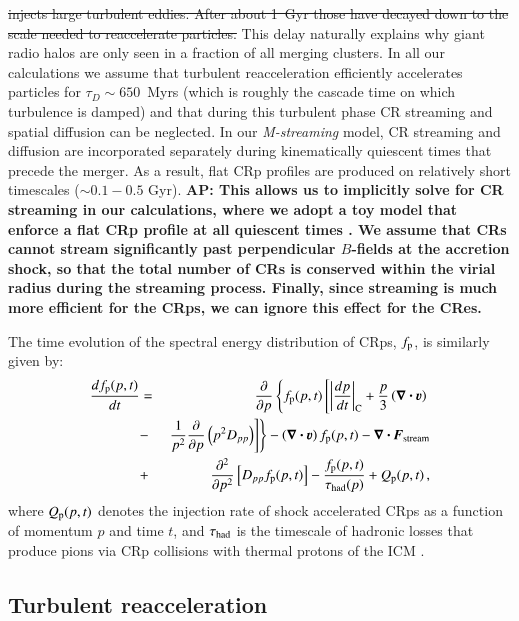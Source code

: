 \documentclass[a4paper,fleqn,usenatbib]{mnras}
\newcommand{\bcdot}{\ensuremath{%
  \mathchoice%
   {\mskip\thinmuskip\lower0.2ex\hbox{\scalebox{1.5}{$\cdot$}}\mskip\thinmuskip}}%
   {\mskip\thinmuskip\lower0.2ex\hbox{\scalebox{1.5}{$\cdot$}}\mskip\thinmuskip}%
   {\lower0.3ex\hbox{\scalebox{1.2}{$\cdot$}}}%
   {\lower0.3ex\hbox{\scalebox{1.2}{$\cdot$}}}%
}
\newcommand{\Mstream}{{\it M-streaming}\xspace}
\renewcommand{\vec}{\ensuremath{\mathbfit}}
\newcommand{\bvel}{\ensuremath{\boldsymbol{\varv}}}
\newcommand{\bnabla}{\ensuremath{\boldsymbol{\nabla}}}
\def\AP#1{{\bf  AP: #1}}
\begin{document}
\sout{injects large turbulent eddies. After about 1~Gyr those have
  decayed down to the scale needed to reaccelerate particles.} This
delay naturally explains why giant radio halos are only seen in a
fraction of all merging clusters. In all our calculations we assume
that turbulent reacceleration efficiently accelerates particles for
$\tau_D\sim650$~Myrs (which is roughly the cascade time on which
turbulence is damped) and that during this turbulent phase CR
streaming and spatial diffusion can be neglected. In our \Mstream
model, CR streaming and diffusion are incorporated separately during
kinematically quiescent times that precede the merger. As a result,
flat CRp profiles are produced on relatively short timescales ($\sim
0.1-0.5$ Gyr). \AP{This allows us to implicitly solve for CR streaming
  in our calculations, where we adopt a toy model that enforce a flat
  CRp profile at all quiescent times \citep{wiener13}. We assume that
  CRs cannot stream significantly past perpendicular $B$-fields at the
  accretion shock, so that the total number of CRs is conserved within
  the virial radius during the streaming process. Finally, since
  streaming is much more efficient for the CRps, we can ignore this
  effect for the CRes.}

The time evolution of the spectral energy distribution of CRps,
$f_{{\mathrm{p}}}$, is similarly given by:
\begin{eqnarray}
{{d f_{\rmn{p}}(p,t)}\over{d t}} &=&
{{\partial }\over{\partial p}}
\left\{
f_{\rmn{p}}(p,t)\left[ \left|{{dp}\over{dt}}\right|_{\rm C}
+ \frac{p}{3}\left(\bnabla\bcdot \bvel\right)\right.\right.
\nonumber\\
&-&\left.\left. {1\over{p^2}}{{\partial }\over{\partial p}}\left(p^2 D_{pp}\right)
\right]\right\} - \left(\bnabla\bcdot \bvel\right) f_{\rmn{p}}(p,t)
- \bnabla\bcdot \vec{F}_\rmn{stream}
\nonumber\\
&+& {{\partial^2 }\over{\partial p^2}}
\left[ D_{pp} f_{\rmn{p}}(p,t) \right] - {{f_{\rmn{p}}(p,t)}\over{\tau_{\rm had}(p)}}
+ Q_{\rmn{p}}(p,t)\, ,
\label{eq:FP_p}
\end{eqnarray}
where $Q_{{\mathrm{p}}}(p,t)$ denotes the injection rate of shock
accelerated CRps as a function of momentum $p$ and time $t$, and
$\tau_{\rm had}$ is the timescale of hadronic losses that produce
pions via CRp collisions with thermal protons of the ICM
\cite[e.g.][]{brunetti11}.  


\subsection{Turbulent reacceleration}
\end{document}
